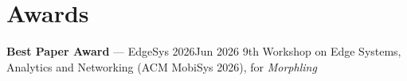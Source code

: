 \section{Awards}
  \resumeSubHeadingListStart
    \resumeSubheading
      {\textbf{Best Paper Award} --- EdgeSys 2026}{Jun 2026}
      {9th Workshop on Edge Systems, Analytics and Networking (ACM MobiSys 2026), for \textit{Morphling}}{}
  \resumeSubHeadingListEnd
